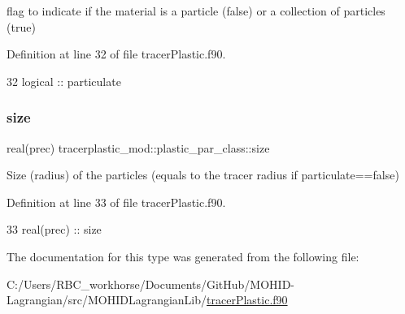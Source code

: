 flag to indicate if the material is a particle (false) or a collection of particles (true) 



Definition at line 32 of file tracer\+Plastic.\+f90.


\begin{DoxyCode}
32         \textcolor{keywordtype}{logical}    :: particulate
\end{DoxyCode}
\mbox{\label{structtracerplastic__mod_1_1plastic__par__class_a0dd25951e4670cedda088f8a6833ad1b}} 
\subsubsection{\texorpdfstring{size}{size}}
{\footnotesize\ttfamily real(prec) tracerplastic\+\_\+mod\+::plastic\+\_\+par\+\_\+class\+::size\hspace{0.3cm}{\ttfamily [private]}}



Size (radius) of the particles (equals to the tracer radius if particulate==false) 



Definition at line 33 of file tracer\+Plastic.\+f90.


\begin{DoxyCode}
33         \textcolor{keywordtype}{real(prec)} :: size
\end{DoxyCode}


The documentation for this type was generated from the following file\+:\begin{DoxyCompactItemize}
\item 
C\+:/\+Users/\+R\+B\+C\+\_\+workhorse/\+Documents/\+Git\+Hub/\+M\+O\+H\+I\+D-\/\+Lagrangian/src/\+M\+O\+H\+I\+D\+Lagrangian\+Lib/\mbox{\hyperlink{tracer_plastic_8f90}{tracer\+Plastic.\+f90}}\end{DoxyCompactItemize}
